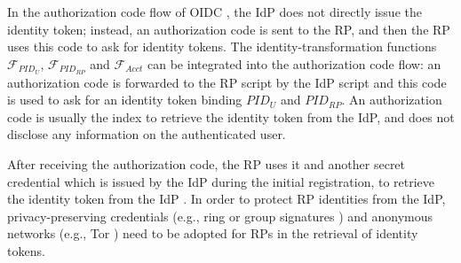 


\vspace{0.8mm}
In the authorization code flow of OIDC \cite{OpenIDConnect},
    the IdP does not directly issue the identity token;
        instead,
            an authorization code is sent to the RP,
            and then the RP uses this code to ask for identity tokens.
The identity-transformation functions $\mathcal{F}_{PID_{U}}$, $\mathcal{F}_{PID_{RP}}$ and $\mathcal{F}_{Acct}$
    can be integrated into the authorization code flow:
            an authorization code is forwarded to the RP script by the IdP script
                and this code is used to ask for an identity token binding $PID_U$ and $PID_{RP}$.
An authorization code is usually the index to retrieve the identity token from the IdP,
        and does not disclose any information on the authenticated user.


After receiving the authorization code, the RP uses it and another secret credential
         which is issued by the IdP during the initial registration,
     to retrieve the identity token from the IdP \cite{OpenIDConnect}.
In order to protect RP identities from the IdP,
        privacy-preserving credentials (e.g., ring or group signatures \cite{ring-sig,chaum1991group})
        and anonymous networks (e.g., Tor \cite{tor}) need to be adopted for RPs in the retrieval of identity tokens.




